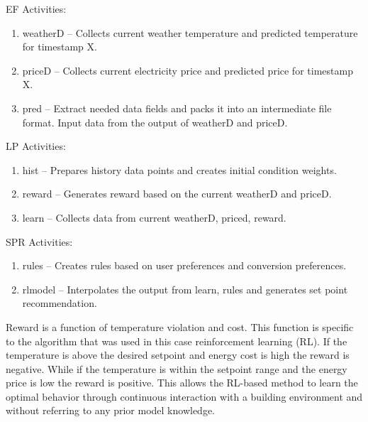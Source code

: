 



EF Activities:

\begin{enumerate}
\item weatherD -- Collects current weather temperature and predicted temperature for timestamp X.
\item priceD -- Collects current electricity price and predicted price for timestamp X.
\item pred -- Extract needed data fields and packs it into an intermediate file format. Input data from the output of weatherD and priceD.
\end{enumerate}


LP Activities:

\begin{enumerate}
\item hist -- Prepares history data points and creates initial condition weights.
\item reward -- Generates reward based on the current weatherD and priceD.
\item learn -- Collects data from current weatherD, priced, reward.
\end{enumerate}

SPR Activities:

\begin{enumerate}
\item rules -- Creates rules based on user preferences and conversion preferences.
\item rlmodel --  Interpolates the output from learn, rules and generates set point recommendation.
\end{enumerate}

Reward is a function of temperature violation and cost. This function is specific to the algorithm that was used in this case reinforcement learning (RL). If the temperature is above the desired setpoint and energy cost is high the reward is negative. While if the temperature is within the setpoint range and the energy price is low the reward is positive. This allows the RL-based method to learn the optimal behavior through continuous interaction with a building environment and without referring to any prior model knowledge. 


